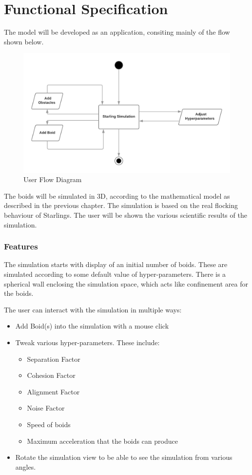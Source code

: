 \documentclass[a4paper,12pt,openany]{book}
\begin{document}
\chapter{Functional Specification}

The model will be developed as an application, consiting mainly of the flow shown below. 

\begin{figure}[h]
\centering
\includegraphics[scale=0.9]{UserFlowDiagram}
\caption{User Flow Diagram}
\end{figure}

The boids will be simulated in 3D, according to the mathematical model as described in the previous chapter. The simulation is based on the real flocking behaviour of Starlings. The user will be shown the various scientific results of the simulation.

\subsection*{Features}

The simulation starts with display of an initial number of boids. These are simulated according to some default value of hyper-parameters. There is a spherical wall enclosing the simulation space, which acts like confinement area for the boids.

The user can interact with the simulation in multiple ways:
\begin{itemize}

\item Add Boid(s) into the simulation with a mouse click
\item Tweak various hyper-parameters. These include:
\begin{itemize}
\item Separation Factor
\item Cohesion Factor
\item Alignment Factor
\item Noise Factor
\item Speed of boids
\item Maximum acceleration that the boids can produce
\end{itemize} 

\item Rotate the simulation view to be able to see the simulation from various angles.

\end{itemize}
\end{document}
